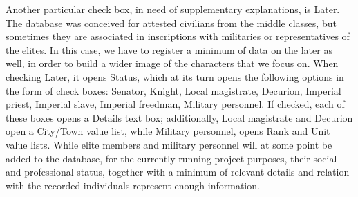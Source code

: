 \documentclass[amsthm,ebook]{saparticle}
\begin{document}
Another particular check box, in need of supplementary explanations, is Later. The database was conceived for attested
civilians from the middle classes, but sometimes they are associated in inscriptions with militaries or representatives
of the elites. In this case, we have to register a minimum of data on the later as well, in order to build a wider
image of the characters that we focus on. When checking Later, it opens Status, which at its turn opens the following
options in the form of check boxes: Senator, Knight, Local magistrate, Decurion, Imperial priest, Imperial slave,
Imperial freedman, Military personnel. If checked, each of these boxes opens a Details text box; additionally, Local
magistrate and Decurion open a City/Town value list, while Military personnel, opens Rank and Unit value lists. While
elite members and military personnel will at some point be added to the database, for the currently running project
purposes, their social and professional status, together with a minimum of relevant details and relation with the
recorded individuals represent enough information. 
\end{document}
